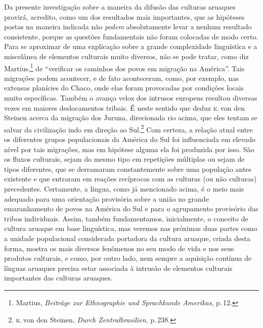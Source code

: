 Da presente investigação sobre a maneira da difusão das culturas
aruaques provirá, acredito, como um dos resultados mais importantes, que
as hipóteses postas na maneira indicada não \textit{podem} absolutamente
levar a nenhum resultado consistente, porque as questões fundamentais
não foram colocadas de modo certo. Para se aproximar de uma explicação
sobre a grande complexidade linguística e a miscelânea de elementos
culturais muito diversos, não se pode tratar, como diz Martius,\footnote{Martius,
  \textit{Beiträge zur Ethnographie und Sprachkunde Amerikas}, p.\,12.} de ``verificar os caminhos dos povos em migração na América''.
Tais migrações podem acontecer, e de fato aconteceram, como, por
exemplo, nas extensas planícies do Chaco, onde elas foram provocadas por
condições locais muito específicas. Também o avanço veloz dos intrusos
europeus resultou diversas vezes em maiores deslocamentos tribais.
É neste sentido que deduz \textsc{k}.\,von den Steinen acerca da migração dos Juruna, direcionada rio
acima, que eles tentam se salvar da civilização indo em direção ao
Sul.\footnote{\textsc{k}.\,von den Steinen, \textit{Durch Zentralbrasilien}, p.\,238.}
Com certeza, a relação atual entre os diferentes grupos populacionais da
América do Sul foi influenciada em elevado nível por tais migrações, mas
em hipótese alguma ela foi produzida por isso. São os fluxos culturais,
sejam do mesmo tipo em repetições múltiplas ou sejam de tipos
diferentes, que se derramaram constantemente sobre uma população antes
existente e que entraram em reações recíprocas com as culturas (ou
não culturas) precedentes. Certamente, a língua, como já mencionado
acima, é o meio mais adequado para uma orientação provisória sobre a
união no grande emaranhamento de povos na América do Sul e para o
agrupamento provisório das tribos individuais. Assim, também
fundamentamos, inicialmente, o conceito de cultura aruaque em base
linguística, mas veremos nas próximas duas partes como a unidade
populacional considerada portadora da cultura aruaque, criada desta
forma, mostra os mais diversos fenômenos no seu modo de vida e nos seus
produtos culturais, e como, por outro lado, nem sempre a aquisição
contínua de línguas aruaques precisa estar associada à intrusão de
elementos culturais importantes das culturas aruaques.

